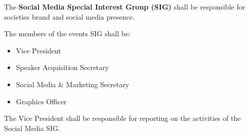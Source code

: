 \begin{clause}
    The \textbf{Social Media Special Interest Group (SIG)} shall be responsible for societies brand and social media presence.
\end{clause}

\begin{subclause}
    The members of the events SIG shall be:
    \begin{itemize}[label=--,topsep=0em,itemsep=0em]
        \item Vice President
        \item Speaker Acquisition Secretary
        \item Social Media \& Marketing Secretary
        \item Graphics Officer
    \end{itemize}
\end{subclause}

\begin{subclause}
    The Vice President shall be responsible for reporting on the activities of the Social Media SIG.
\end{subclause}
